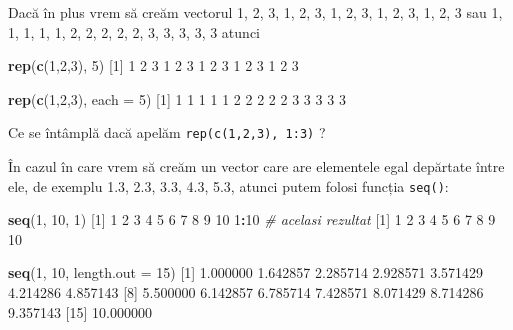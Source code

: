\documentclass[]{article}
\newenvironment{Shaded}{\begin{snugshade}}{\end{snugshade}}
\newcommand{\KeywordTok}[1]{\textcolor[rgb]{0.13,0.29,0.53}{\textbf{#1}}}
\newcommand{\DataTypeTok}[1]{\textcolor[rgb]{0.13,0.29,0.53}{#1}}
\newcommand{\DecValTok}[1]{\textcolor[rgb]{0.00,0.00,0.81}{#1}}
\newcommand{\FloatTok}[1]{\textcolor[rgb]{0.00,0.00,0.81}{#1}}
\newcommand{\CommentTok}[1]{\textcolor[rgb]{0.56,0.35,0.01}{\textit{#1}}}
\newcommand{\OperatorTok}[1]{\textcolor[rgb]{0.81,0.36,0.00}{\textbf{#1}}}
\newcommand{\NormalTok}[1]{#1}
\begin{document}
Dacă în plus vrem să creăm vectorul 1, 2, 3, 1, 2, 3, 1, 2, 3, 1, 2, 3,
1, 2, 3 sau 1, 1, 1, 1, 1, 2, 2, 2, 2, 2, 3, 3, 3, 3, 3 atunci

\begin{Shaded}
\begin{Highlighting}[]
\KeywordTok{rep}\NormalTok{(}\KeywordTok{c}\NormalTok{(}\DecValTok{1}\NormalTok{,}\DecValTok{2}\NormalTok{,}\DecValTok{3}\NormalTok{), }\DecValTok{5}\NormalTok{)}
\NormalTok{ [}\DecValTok{1}\NormalTok{] }\DecValTok{1} \DecValTok{2} \DecValTok{3} \DecValTok{1} \DecValTok{2} \DecValTok{3} \DecValTok{1} \DecValTok{2} \DecValTok{3} \DecValTok{1} \DecValTok{2} \DecValTok{3} \DecValTok{1} \DecValTok{2} \DecValTok{3}

\KeywordTok{rep}\NormalTok{(}\KeywordTok{c}\NormalTok{(}\DecValTok{1}\NormalTok{,}\DecValTok{2}\NormalTok{,}\DecValTok{3}\NormalTok{), }\DataTypeTok{each =} \DecValTok{5}\NormalTok{)}
\NormalTok{ [}\DecValTok{1}\NormalTok{] }\DecValTok{1} \DecValTok{1} \DecValTok{1} \DecValTok{1} \DecValTok{1} \DecValTok{2} \DecValTok{2} \DecValTok{2} \DecValTok{2} \DecValTok{2} \DecValTok{3} \DecValTok{3} \DecValTok{3} \DecValTok{3} \DecValTok{3}
\end{Highlighting}
\end{Shaded}

Ce se întâmplă dacă apelăm \texttt{rep(c(1,2,3),\ 1:3)} ?

În cazul în care vrem să creăm un vector care are elementele egal
depărtate între ele, de exemplu 1.3, 2.3, 3.3, 4.3, 5.3, atunci putem
folosi funcția \texttt{seq()}:

\begin{Shaded}
\begin{Highlighting}[]
\KeywordTok{seq}\NormalTok{(}\DecValTok{1}\NormalTok{, }\DecValTok{10}\NormalTok{, }\DecValTok{1}\NormalTok{)}
\NormalTok{ [}\DecValTok{1}\NormalTok{]  }\DecValTok{1}  \DecValTok{2}  \DecValTok{3}  \DecValTok{4}  \DecValTok{5}  \DecValTok{6}  \DecValTok{7}  \DecValTok{8}  \DecValTok{9} \DecValTok{10}
\DecValTok{1}\OperatorTok{:}\DecValTok{10} \CommentTok{# acelasi rezultat}
\NormalTok{ [}\DecValTok{1}\NormalTok{]  }\DecValTok{1}  \DecValTok{2}  \DecValTok{3}  \DecValTok{4}  \DecValTok{5}  \DecValTok{6}  \DecValTok{7}  \DecValTok{8}  \DecValTok{9} \DecValTok{10}

\KeywordTok{seq}\NormalTok{(}\DecValTok{1}\NormalTok{, }\DecValTok{10}\NormalTok{, }\DataTypeTok{length.out =} \DecValTok{15}\NormalTok{)}
\NormalTok{ [}\DecValTok{1}\NormalTok{]  }\FloatTok{1.000000}  \FloatTok{1.642857}  \FloatTok{2.285714}  \FloatTok{2.928571}  \FloatTok{3.571429}  \FloatTok{4.214286}  \FloatTok{4.857143}
\NormalTok{ [}\DecValTok{8}\NormalTok{]  }\FloatTok{5.500000}  \FloatTok{6.142857}  \FloatTok{6.785714}  \FloatTok{7.428571}  \FloatTok{8.071429}  \FloatTok{8.714286}  \FloatTok{9.357143}
\NormalTok{[}\DecValTok{15}\NormalTok{] }\FloatTok{10.000000}
\end{Highlighting}
\end{Shaded}
\end{document}

